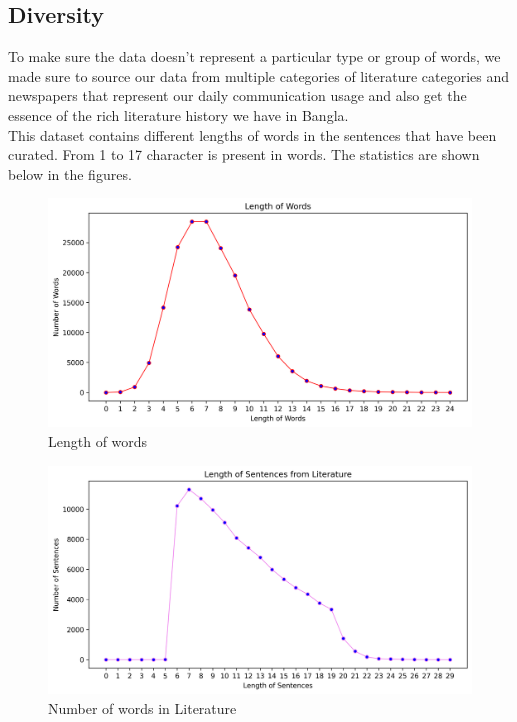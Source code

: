 \subsection{Diversity}
To make sure the data doesn't represent a particular type or group of words, we made sure to source our data from multiple categories of literature categories and newspapers that represent our daily communication usage and also get the essence of the rich literature history we have in Bangla. \\
\hspace{0.5cm}This dataset contains different lengths of words in the sentences that have been curated. From 1 to 17 character is present in words. The statistics are shown below in the figures.
        \begin{figure}[h!]
            \centering
        \includegraphics[scale=.7]{Images/Graph/output2.png}
                \caption{Length of words}
            \label{fig: Length of words}
        \end{figure}
        \newpage        
        \begin{figure}[h!]
            \centering
        \includegraphics[scale=.7]{Images/Graph/output3.png}
                \caption{Number of words in Literature }
            \label{fig: Number of words in Literature}
        \end{figure}
        \newpage
        
